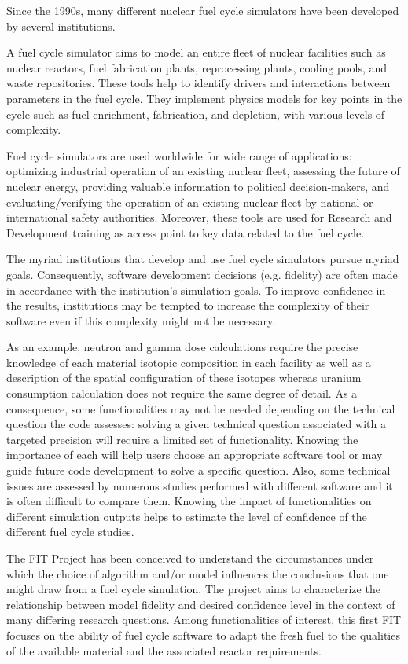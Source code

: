 Since the 1990s, many different nuclear fuel cycle simulators have been developed by several institutions.

A fuel cycle simulator aims to model an entire fleet of nuclear facilities such as nuclear reactors, fuel fabrication plants, reprocessing plants, cooling pools, and waste repositories.
These tools help to identify drivers and interactions between parameters in the fuel cycle.
They implement physics models for key points in the cycle such as fuel enrichment, fabrication, and depletion, with various levels of complexity.

Fuel cycle simulators are used worldwide for wide range of applications: optimizing industrial operation of an existing nuclear fleet, assessing the future of nuclear energy, providing valuable information to political decision-makers, and evaluating/verifying the operation of an existing nuclear fleet by national or international safety authorities.
Moreover, these tools are used for Research and Development training as access point to key data related to the fuel cycle.

The myriad institutions that develop and use fuel cycle simulators pursue myriad goals.
Consequently, software development decisions (e.g. fidelity) are often made in accordance with the institution's simulation goals. To improve confidence in the results, institutions may be tempted to increase the complexity of their software even if this complexity might not be necessary.

As an example, neutron and gamma dose calculations require the precise knowledge of each material isotopic composition in each facility as well as a description of the spatial configuration of these isotopes whereas uranium consumption calculation does not require the same degree of detail.
As a consequence, some functionalities may not be needed depending on the technical question the code assesses: solving a given technical question associated with a targeted precision will require a limited set of functionality.
Knowing the importance of each will help users choose an appropriate software tool or may guide future code development to solve a specific question.
Also, some technical issues are assessed by numerous studies performed with different software and it is often difficult to compare them.
Knowing the impact of functionalities on different simulation outputs helps to estimate the level of confidence of the different fuel cycle studies.

The \gls{FIT} Project has been conceived to understand the circumstances under which the choice of algorithm and/or model influences the conclusions that one might draw from a fuel cycle simulation.
The project aims to characterize the relationship between model fidelity and desired confidence level in the context of many differing research questions.
Among functionalities of interest, this first \gls{FIT} focuses on the ability of fuel cycle software to adapt the fresh fuel to the qualities of the available material and the associated reactor requirements.

